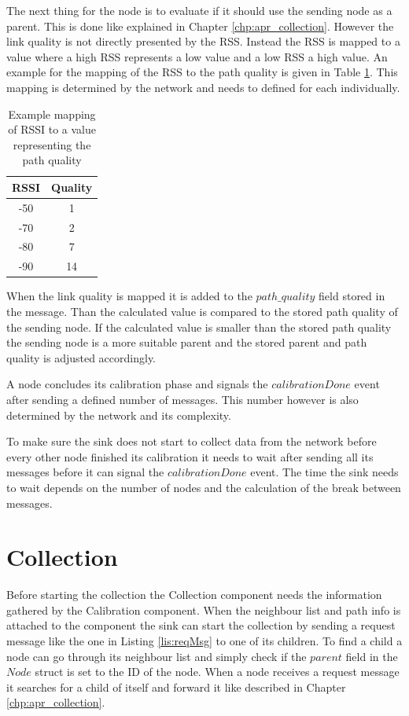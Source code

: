The next thing for the node is to evaluate if it should use the sending node as a parent. This is done like explained in Chapter \ref{chp:apr_collection}. However the link quality is not directly presented by the RSS. Instead the RSS is mapped to a value where a high RSS represents a low value and a low RSS a high value. An example for the mapping of the RSS to the path quality is given in Table \ref{tab:mappingRSSI}. This mapping is determined by the network and needs to defined for each individually.
\begin{table}[htbp]
 \caption{Example mapping of RSSI to a value representing the path quality}
 \centering
 \begin{tabular}{c|c}
  RSSI & Quality\\ \toprule
  -50 & 1 \\
  -70 & 2 \\
  -80 & 7 \\
  -90 & 14 \\
 \end{tabular}
 \label{tab:mappingRSSI}
\end{table}
When the link quality is mapped it is added to the $path\_quality$ field stored in the message. Than the calculated value is compared to the stored path quality of the sending node. If the calculated value is smaller than the stored path quality the sending node is a more suitable parent and the stored parent and path quality is adjusted accordingly.   

A node concludes its calibration phase and signals the $calibrationDone$ event after sending a defined number of messages. This number however is also determined by the network and its complexity.  

To make sure the sink does not start to collect data from the network  before every other node finished its calibration it needs to wait after sending all its messages before it can signal the $calibrationDone$ event. The time the sink needs to wait depends on the number of nodes and the calculation of the break between messages.
 
\section{Collection}
\label{chp:imp_collection}
Before starting the collection the Collection component needs the information gathered by the Calibration component. When the neighbour list and path info is attached to the component the sink can start the collection by sending a request message like the one in Listing \ref{lis:reqMsg} to one of its children. To find a child a node can go through its neighbour list and simply check if the $parent$ field in the $Node$ struct is set to the ID of the node. When a node receives a request message it searches for a child of itself and forward it like described in Chapter \ref{chp:apr_collection}.

